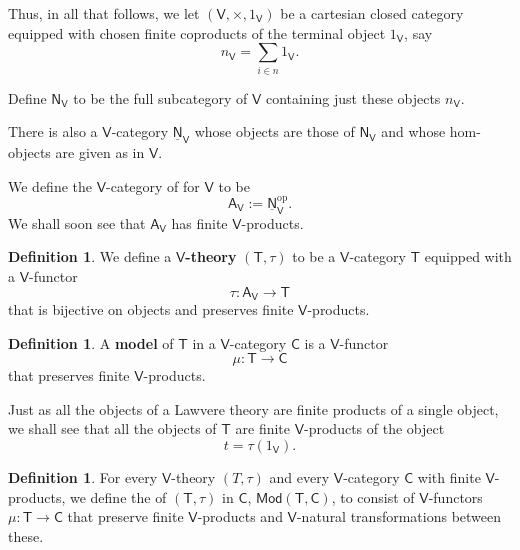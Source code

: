 \documentclass{amsart}
\newcommand{\define}[1]{{\bf \boldmath{#1}}}
\theoremstyle{definition}
\newtheorem{definition}[theorem]{Definition}
\newcommand{\Mod}{\mathsf{Mod}}
\newcommand{\NN}{\mathsf{N}}
\newcommand{\A}{\mathsf{A}}
\newcommand{\V}{\mathsf{V}}
\newcommand{\C}{\mathsf{C}}
\newcommand{\T}{\mathsf{T}}
\newcommand{\op}{\mathrm{op}}
\newcommand{\maps}{\colon}
\begin{document}
Thus, in all that follows, we let $(\V,\times,1_\V)$ be a cartesian closed category equipped with chosen finite coproducts of the terminal object $1_\V$, say 
\[   n_\V = \sum_{i \in n} 1_\V . \]  
\iffalse
These objects come with natural isomorphisms
\[
\V(n_\V,a) \cong\V(1_\V,a)^n .
\]
\fi
Define $\NN_\V$ to be the full subcategory of $\V$ containing just these objects $n_\V$.  
\iffalse
Since $\NN_\V$ has finite coproducts, $\NN_\V^\op$ has finite products.  
Let
\[ j \maps \NN_\V \hookrightarrow \V \]
be the inclusion.    
\fi
There is also a $\V$-category $\underline{\NN}_\V$ whose objects are those of $\NN_\V$ and whose hom-objects are given as in $\V$.   
\iffalse
\[         \NN_\V(a,b) = j(b)^{j(a)}  \]
for all $a,b \in \NN_\V$. 
\fi
We define the $\V$-category of \define{arities} for $\V$ to be 
\[             \A_\V := \underline{\NN}_\V^\op   .\]
We shall soon see that $\A_\V$ has finite $\V$-products. 

\begin{definition}
\label{defn:V-theory}
We define a \textbf{$\V$-theory} $(\T,\tau)$ to be a $\V$-category $\T$ equipped with a $\V$-functor 
\[ \tau  \maps \A_\V \to \T \]
that is bijective on objects and preserves finite $\V$-products.
\end{definition}

\begin{definition}
A \textbf{model} of $\T$ in a $\V$-category $\C$ is a $\V$-functor 
\[  \mu \maps \T \to \C \]
that preserves finite $\V$-products.
\end{definition}

Just as all the objects of a Lawvere theory are finite products of a single object, we shall see that all the objects of $\T$ are finite $\V$-products of the object 
\[   t = \tau(1_\V) .\]   

\iffalse
Just as every object of $\NN^\op$ is a power of $1$, every object of $\NN_\V^\op$ is a power of $1_\V$.  This fact comes from the isomorphism $n_\V \cong n_\V^1$ in $\NN_\V$ by taking opposites.   Then, since $\tau$ preserves finite powers and is bijective on objects, it follows that every object of $\T$ is a finite power of $t$.   CHECK THIS STUFF CAREFULLY!!!
\fi

\begin{definition}
For every $\V$-theory $(T,\tau)$ and every $\V$-category $\C$ with finite $\V$-products, we define the \define{category of models} of $(\T,\tau)$ in $\C$, $\Mod(\T,\C)$, to consist of $\V$-functors $\mu \maps \T\to \C$ that preserve finite $\V$-products and $\V$-natural transformations between these.
\end{definition}
\end{document}
